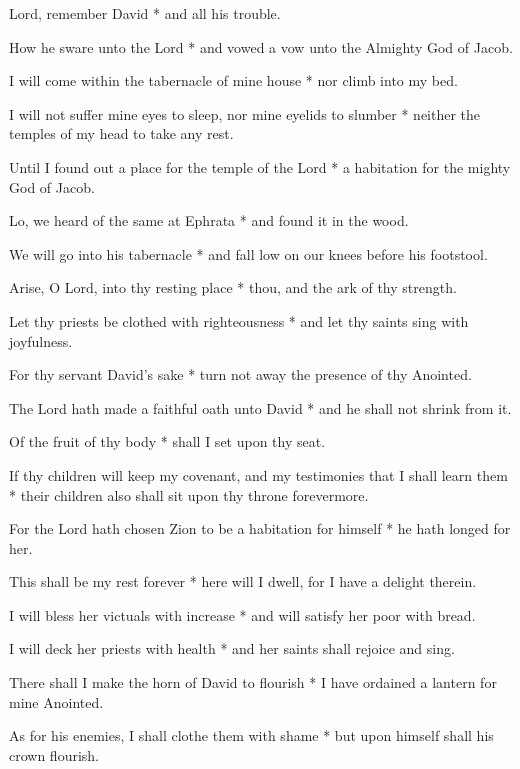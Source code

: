 \begin{multicols}{2}
	
	Lord, remember David * and all his trouble.
	
	How he sware unto the Lord * and vowed a vow unto the Almighty God of Jacob.
	
	I will come within the tabernacle of mine house * nor climb into my bed.
	
	I will not suffer mine eyes to sleep, nor mine eyelids to slumber * neither the temples of my head to take any rest.
	
	Until I found out a place for the temple of the Lord * a habitation for the mighty God of Jacob.
	
	Lo, we heard of the same at Ephrata * and found it in the wood.
	
	We will go into his tabernacle * and fall low on our knees before his footstool.
	
	Arise, O Lord, into thy resting place * thou, and the ark of thy strength.
	
	Let thy priests be clothed with righteousness * and let thy saints sing with joyfulness.
	
	For thy servant David's sake * turn not away the presence of thy Anointed.
	
	The Lord hath made a faithful oath unto David * and he shall not shrink from it.
	
	Of the fruit of thy body * shall I set upon thy seat.
	
	If thy children will keep my covenant, and my testimonies that I shall learn them * their children also shall sit upon thy throne forevermore.
	
	For the Lord hath chosen Zion to be a habitation for himself * he hath longed for her.
	
	This shall be my rest forever * here will I dwell, for I have a delight therein.
	
	I will bless her victuals with increase * and will satisfy her poor with bread.
	
	I will deck her priests with health * and her saints shall rejoice and sing.
	
	There shall I make the horn of David to flourish * I have ordained a lantern for mine Anointed.
	
	As for his enemies, I shall clothe them with shame * but upon himself shall his crown flourish.
	
	\gloria{}
\end{multicols}